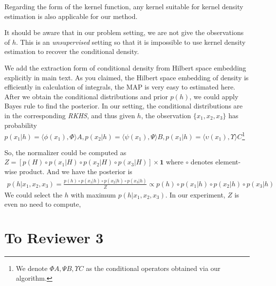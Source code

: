 \documentclass{article}
\newcommand{\bodai}[1]{{\color{violet}{\bf\sf [Dai remark: #1]}}}
\begin{document}
Regarding the form of the kernel function, any kernel suitable for kernel density estimation is also applicable for our method.
\bodai{this reviewer also questions about the kernel form saying `'you need a kernel which concentrates around x; think of a delta-distribution. So rule out polynomial kernels and, I guess, kernels on structures like graphs.''}

It should be aware that in our problem setting, we are not give the observations of $h$. This is an \emph{unsupervised} setting so that it is impossible to use kernel density estimation to recover the conditional density.

We add the extraction form of conditional density from Hilbert space embedding explicitly in main text. As you claimed, the Hilbert space embedding of density is efficiently in calculation of integrals, the MAP is very easy to estimated here. After we obtain the conditional distributions and prior $p(h)$, we could apply Bayes rule to find the posterior. In our setting, the conditional distributions are in the corresponding \emph{RKHS}, and thus given $h$, the observation $\{x_1,x_2,x_3\}$ has probability $p(x_1|h) = \langle\phi(x_1), \Phi \rangle A, p(x_2|h) = \langle\psi(x_1), \Psi \rangle B, p(x_1|h) = \langle\upsilon(x_1), \Upsilon \rangle C$\footnote{We denote $\Phi A, \Psi B, \Upsilon C$ as the conditional operators obtained via our algorithm.}

So, the normalizer could be computed as $Z = [p(H)\circ p(x_1|H)\circ p(x_2|H)\circ p(x_3|H)] \times \bm{1}$ where $\circ$ denotes element-wise product. And we have the posterior is
%
\begin{eqnarray*}
p(h|x_1, x_2, x_3) = \frac{p(h)\circ p(x_1|h)\circ p(x_2|h)\circ p(x_3|h)}{Z} \propto p(h)\circ p(x_1|h)\circ p(x_2|h)\circ p(x_3|h)
\end{eqnarray*}
%
We could select the $h$ with maximum $p(h|x_1, x_2, x_3)$. In our experiment, $Z$ is even no need to compute, 

\section*{To Reviewer 3}
\end{document}
